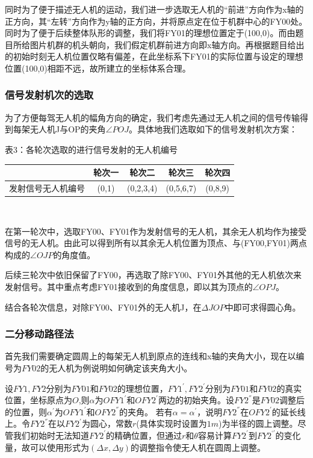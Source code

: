 \documentclass{ctexart}
\begin{document}
同时为了便于描述无人机的运动，我们进一步选取无人机的“前进”方向作为x轴的正方向，其“左转”方向作为y轴的正方向，并将原点定在位于机群中心的FY00处。同时为了便于后续整体队形的调整，我们将FY01的理想位置定于(100,0)。而由题目所给图片机群的机头朝向，我们假定机群前进方向即x轴方向。再根据题目给出的初始时刻无人机位置仅略有偏差，在此坐标系下FY01的实际位置与设定的理想位置(100,0)相距不远，故所建立的坐标体系合理。

  \subsubsection{信号发射机次的选取}
  为了方便每驾无人机的幅角方向的确定，我们考虑先通过无人机之间的信号传输得到每架无人机J与OP的夹角$\angle POJ$。具体地我们选取如下的信号发射机次方案：

  \begin{center}
  表3：各轮次选取的进行信号发射的无人机编号
  ~\\
    \begin{tabular}{|c|c|c|c|c|}
        \hline
        &轮次一&轮次二&轮次三&轮次四\\ 
        \hline
        发射信号无人机编号&(0,1)&(0,2,3,4)&(0,5,6,7)&(0,8,9)\\
        \hline
    \end{tabular}\\
  \end{center}

在第一轮次中，选取FY00、FY01作为发射信号的无人机，其余无人机均作为接受信号的无人机。由此可以得到所有以其余无人机位置为顶点、与(FY00,FY01)两点构成的$\angle OJP$的角度值。

后续三轮次中依旧保留了FY00，再选取了除FY00、FY01外其他的无人机依次来发射信号。其中重点考虑FY01接收到的角度信息，即以其为顶点的$\angle OPJ$。

结合各轮次信息，对除FY00、FY01外的无人机J，在$\Delta JOP$中即可求得圆心角。

\subsubsection{二分移动路径法}

首先我们需要确定圆周上的每架无人机到原点的连线和x轴的夹角大小，现在以编号为$FY02$的无人机为例说明如何确定该夹角大小。

  设$FY1,FY2$分别为$FY01$和$FY02$的理想位置，$FY1^{'},FY2^{'}$分别为$FY01$和$FY02$的真实位置，坐标原点为$O$,则$\alpha$为$OFY1^{'}$和$OFY2^{'}$两边的初始夹角。设$FY2^{''}$是$FY02$调整后的位置，则$\alpha^{'}$为$OFY1^{'}$和$OFY2^{''}$的夹角。
  若有$\alpha = \alpha^{'}$，说明$FY2^{''}$在$OFY2^{'}$的延长线上。令$FY2^{''}$在以$FY2^{'}$为圆心，常数$r$(具体实现时设置为$1m$)为半径的圆上调整。尽管我们初始时无法知道$FY2^{'}$的精确位置，但通过$r$和$\theta$容易计算$FY2^{'}$到$FY2^{‘'}$的变化量，故可以使用形式为$(\Delta x,\Delta y)$的调整指令使无人机在圆周上调整。
  
\end{document}
